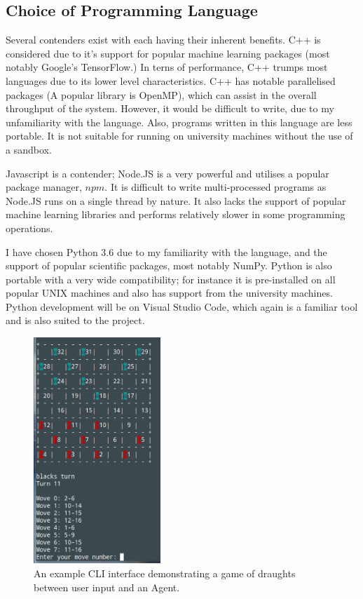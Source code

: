 \documentclass[12pt,a4paper]{article}
\begin{document}
\subsection*{Choice of Programming Language}

    Several contenders exist with each having their inherent benefits. C++ is considered due to it's support for popular machine learning packages (most notably Google's TensorFlow.) In terns of performance, C++ trumps most languages due to its lower level characteristics. C++ has notable parallelised packages (A popular library is OpenMP), which can assist in the overall throughput of the system. However, it would be difficult to write, due to my unfamiliarity with the language. Also, programs written in this language are less portable. It is not suitable for running on university machines without the use of a sandbox.

    Javascript is a contender; Node.JS is a very powerful and utilises a popular package manager, $npm$. It is difficult to write multi-processed programs as Node.JS runs on a single thread by nature. It also lacks the support of popular machine learning libraries and performs relatively slower in some programming operations.

    I have chosen Python 3.6 due to my familiarity with the language, and the support of popular scientific packages, most notably NumPy. Python is also portable with a very wide compatibility; for instance it is pre-installed on all popular UNIX machines and also has support from the university machines. Python development will be on Visual Studio Code, which again is a familiar tool and is also suited to the project.

    \begin{figure}
            \vspace{-30pt}
            \centering
            \caption{An example CLI interface demonstrating a game of draughts between user input and an Agent. \label{cli_human_input}}
            \includegraphics[width=48mm]{cli_humanvsagent.png}
            \vspace{-20pt}
        \end{figure}
\end{document}
